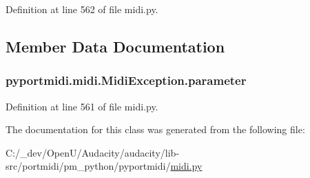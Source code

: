 Definition at line 562 of file midi.\+py.



\subsection{Member Data Documentation}
\subsubsection[{\texorpdfstring{parameter}{parameter}}]{\setlength{\rightskip}{0pt plus 5cm}pyportmidi.\+midi.\+Midi\+Exception.\+parameter}\hypertarget{classpyportmidi_1_1midi_1_1_midi_exception_abe32a7a0db3a0b7cd745c685bbbe7a30}{}\label{classpyportmidi_1_1midi_1_1_midi_exception_abe32a7a0db3a0b7cd745c685bbbe7a30}


Definition at line 561 of file midi.\+py.



The documentation for this class was generated from the following file\+:\begin{DoxyCompactItemize}
\item 
C\+:/\+\_\+dev/\+Open\+U/\+Audacity/audacity/lib-\/src/portmidi/pm\+\_\+python/pyportmidi/\hyperlink{midi_8py}{midi.\+py}\end{DoxyCompactItemize}

